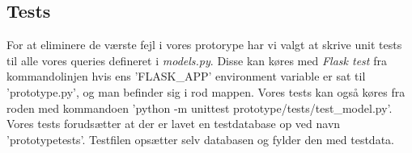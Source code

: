 \subsection{Tests}
For at eliminere de værste fejl i vores protorype har vi valgt at skrive unit tests til alle vores queries defineret i \textit{models.py}. Disse kan køres med \textit{Flask test} fra kommandolinjen hvis ens 'FLASK\_APP' environment variable er sat til 'prototype.py', og man befinder sig i rod mappen. Vores tests kan også køres fra roden med kommandoen 'python -m unittest prototype/tests/test\_model.py'.\\
Vores tests forudsætter at der er lavet en testdatabase op ved navn 'prototypetests'. Testfilen opsætter selv databasen og fylder den med testdata.